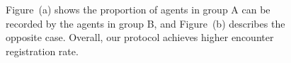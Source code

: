 \begin{figure}[!h]
    \centering
    \hspace{0.01in}
    \caption{Figure~(a) shows the proportion of agents in group A can 
    be recorded by the agents in group B, and Figure~(b) describes
    the opposite case. Overall, our protocol
    achieves higher encounter registration rate.}
    \label{fig9}
\end{figure}
